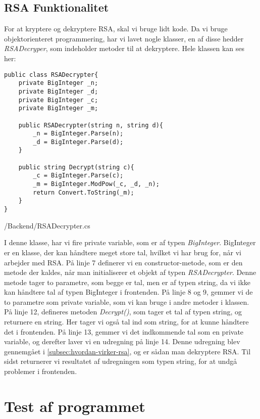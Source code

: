 \documentclass[a4paper,12pt]{extarticle}
\begin{document}
    \subsection{RSA Funktionalitet}\label{subsec:rsa-functionality}
    For at kryptere og dekryptere RSA, skal vi bruge lidt kode.
    Da vi bruge objektorienteret programmering, har vi lavet nogle klasser, en af disse hedder \emph{RSADecryper},
    som indeholder metoder til at dekryptere.
    Hele klassen kan ses her:
    \begin{listing}[!ht]
        \begin{verbatim}
public class RSADecrypter{
    private BigInteger _n;
    private BigInteger _d;
    private BigInteger _c;
    private BigInteger _m;
    
    public RSADecrypter(string n, string d){
        _n = BigInteger.Parse(n);
        _d = BigInteger.Parse(d);
    }
    
    public string Decrypt(string c){
        _c = BigInteger.Parse(c);
        _m = BigInteger.ModPow(_c, _d, _n);
        return Convert.ToString(_m);
    }
}
        \end{verbatim}
        \caption{/Backend/RSADecrypter.cs}
    \end{listing}

    I denne klasse, har vi fire private variable, som er af typen \emph{BigInteger}.
    BigInteger er en klasse, der kan håndtere meget store tal, hvilket vi har brug for, når vi arbejder med RSA.\@
    På linje 7 definerer vi en constructor-metode, som er den metode der kaldes,
    når man initialiserer et objekt af typen \emph{RSADecrypter}.
    Denne metode tager to parametre, som begge er tal, men er af typen string,
    da vi ikke kan håndtere tal af typen BigInteger i frontenden.
    På linje 8 og 9, gemmer vi de to parametre som private variable, som vi kan bruge i andre metoder i klassen.\@
    På linje 12, defineres metoden \emph{Decrypt()}, som tager et tal af typen string, og returnere en string.
    Her tager vi også tal ind som string, for at kunne håndtere det i frontenden.
    På linje 13, gemmer vi det indkommende tal som en private variable, og derefter laver vi en udregning på linje 14.
    Denne udregning blev gennemgået i \autoref{subsec:hvordan-virker-rsa}, og er sådan man dekryptere RSA.\@
    Til sidst returnerer vi resultatet af udregningen som typen string, for at undgå problemer i frontenden.\@


    \section{Test af programmet}\label{sec:testing}
\end{document}
